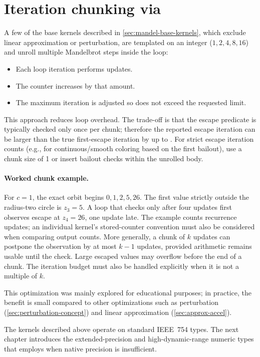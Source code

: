 \section{Iteration chunking via }
\label{sec:chunking}

A few of the base kernels described in \cref{sec:mandel-base-kernels}, which exclude linear approximation or
perturbation, are templated on an integer 
(\(1,2,4,8,16\)) and unroll multiple Mandelbrot steps inside the loop:

\begin{itemize}
  \item Each loop iteration performs  updates.
  \item The counter  increases by that amount.
  \item The maximum iteration  is adjusted so 
        does not exceed the requested limit.
\end{itemize}

This approach reduces loop overhead. The trade-off is that the escape predicate
is typically checked only once per chunk; therefore the reported escape
iteration can be larger than the true first-escape iteration by up to
. For strict escape iteration counts (e.g., for
continuous/smooth coloring based on the first bailout), use a chunk size of 1 or
insert bailout checks within the unrolled body.

\paragraph{Worked chunk example.}
For $c=1$, the exact orbit begins $0,1,2,5,26$. The first value strictly outside
the radius-two circle is $z_3=5$. A loop that checks only after four updates first
observes escape at $z_4=26$, one update late. The example counts recurrence updates;
an individual kernel's stored-counter convention must also be considered when
comparing output counts. More generally, a chunk of $k$ updates can postpone the
observation by at most $k-1$ updates, provided arithmetic remains usable until the
check. Large escaped values may overflow before the end of a chunk. The iteration
budget must also be handled explicitly when it is not a multiple of $k$.

This optimization was mainly explored for educational purposes; in practice, the
benefit is small compared to other optimizations such as perturbation (\cref{sec:perturbation-concept}) and linear
approximation (\cref{sec:approx-accel}).

The kernels described above operate on standard IEEE~754 types.  The next
chapter introduces the extended-precision and high-dynamic-range numeric types
that \FractalShark{} employs when native precision is insufficient.
